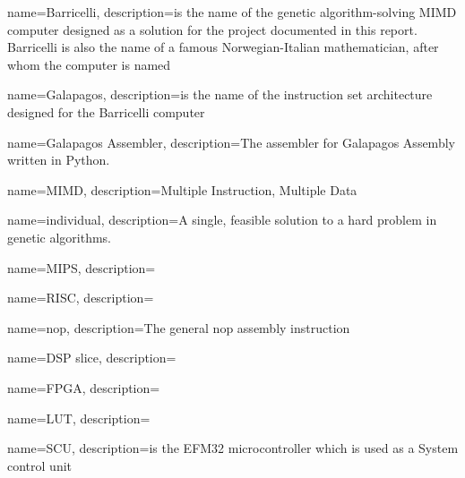 {
name=Barricelli,
description={is the name of the genetic algorithm-solving MIMD computer designed as a solution for the project documented in this report. Barricelli is also the name of a famous Norwegian-Italian mathematician, after whom the computer is named}
}

{
name=Galapagos,
description={is the name of the instruction set architecture designed for the Barricelli computer}
}

{
name=Galapagos Assembler,
description={The assembler for Galapagos Assembly written in Python.}
}

{
name=MIMD,
description={Multiple Instruction, Multiple Data}
}

{
name=individual,
description={A single, feasible solution to a hard problem in genetic algorithms.}
}

{
name=MIPS,
description={}
}

{
name=RISC,
description={}
}

{
name=nop,
description={The general nop assembly instruction }
}

{
name=DSP slice,
description={}
}

{
name=FPGA,
description={}
}

{
name=LUT,
description={}
}

{
name=SCU,
description={is the EFM32 microcontroller which is used as a System control unit}
}
